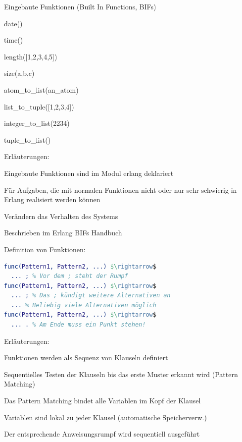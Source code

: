 \documentclass[10pt]{article}
\begin{document}
Eingebaute Funktionen (Built In Functions, BIFs)
\begin{itemize*}
  \item date()
  \item time()
  \item length([1,2,3,4,5])
  \item size({a,b,c})
  \item atom\_to\_list(an\_atom)
  \item list\_to\_tuple([1,2,3,4])
  \item integer\_to\_list(2234)
  \item tuple\_to\_list({})
  \item Erläuterungen:
  \begin{itemize*}
    \item Eingebaute Funktionen sind im Modul erlang deklariert
    \item Für Aufgaben, die mit normalen Funktionen nicht oder nur sehr schwierig in Erlang realisiert werden können
    \item Verändern das Verhalten des Systems
    \item Beschrieben im Erlang BIFs Handbuch
  \end{itemize*}
\end{itemize*}

Definition von Funktionen:
\begin{lstlisting}[language=erlang]
func(Pattern1, Pattern2, ...) $\rightarrow$
  ... ; % Vor dem ; steht der Rumpf
func(Pattern1, Pattern2, ...) $\rightarrow$
  ... ; % Das ; kündigt weitere Alternativen an
  ... % Beliebig viele Alternativen möglich
func(Pattern1, Pattern2, ...) $\rightarrow$
  ... . % Am Ende muss ein Punkt stehen!
\end{lstlisting}
Erläuterungen:
\begin{itemize*}
  \item Funktionen werden als Sequenz von Klauseln definiert
  \item Sequentielles Testen der Klauseln bis das erste Muster erkannt wird (Pattern Matching)
  \item Das Pattern Matching bindet alle Variablen im Kopf der Klausel
  \item Variablen sind lokal zu jeder Klausel (automatische Speicherverw.)
  \item Der entsprechende Anweisungsrumpf wird sequentiell ausgeführt
\end{itemize*}
\end{document}
